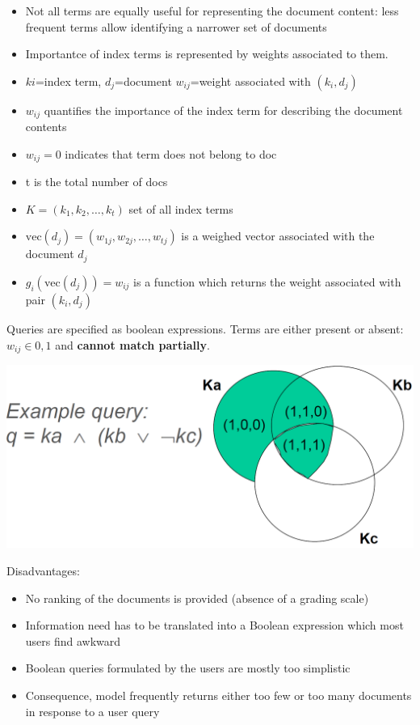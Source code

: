 \begin{breakbox}

\begin{itemize}
	\item Not all terms are equally useful for representing the document content: less frequent terms allow identifying a narrower set of documents
	\item Importantce of index terms is represented by weights associated to them.
	\item $ki$=index term, $d_j$=document $w_{ij}$=weight associated with $(k_i,d_j)$
	\item $w_{ij}$ quantifies the importance of the index term for describing the document contents
	\item $w_{ij}=0$ indicates that term does not belong to doc
	\item t is the total number of docs
	\item $K=(k_1,k_2, \ldots, k_t)$ set of all index terms
	\item $\text{vec}(d_j) = (w_{1j}, w_{2j}, \ldots, w_{tj})$ is a weighed vector associated with the document $d_j$
	\item $g_i(\text{vec}(d_j)) = w_{ij}$ is a function which returns the weight associated with pair $(k_i, d_j)$
\end{itemize}
\end{breakbox}

\begin{breakbox}

Queries are specified as boolean expressions. Terms are either present or absent: $w_{ij} \in {0,1}$ and \textbf{cannot match partially}.

\begin{center}
	\includegraphics[width=.12\textwidth]{slides_images/boolean_model_example}
\end{center}

Disadvantages:
\begin{itemize}
	\item No ranking of the documents is provided (absence of a grading scale)
	\item Information need has to be translated into a
Boolean expression which most users find awkward
	\item Boolean queries formulated by the users are mostly too simplistic
	\item Consequence, model frequently returns either too few or too many documents in response to a user query
\end{itemize}
\end{breakbox}

